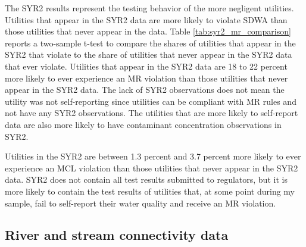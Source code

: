 \documentclass{article}
\begin{document}


The SYR2 results represent the testing behavior of the more negligent utilities. Utilities that appear in the SYR2 data are more likely to violate SDWA than those utilities that never appear in the data. Table \ref{tab:syr2_mr_comparison} reports a two-sample t-test to compare the shares of utilities that appear in the SYR2 that violate to the share of utilities that never appear in the SYR2 data that ever violate. Utilities that appear in the SYR2 data are 18 to 22 percent more likely to ever experience an MR violation than those utilities that never appear in the SYR2 data. The lack of SYR2 observations does not mean the utility was not self-reporting since utilities can be compliant with MR rules and not have any SYR2 observations. The utilities that are more likely to self-report data are also more likely to have contaminant concentration observations in SYR2. 

Utilities in the SYR2 are between 1.3 percent and 3.7 percent more likely to ever experience an MCL violation than those utilities that never appear in the SYR2 data. SYR2 does not contain all test results submitted to regulators, but it is more likely to contain the test results of utilities that, at some point during my sample, fail to self-report their water quality and receive an MR violation.



\subsection{River and stream connectivity data}
\end{document}
